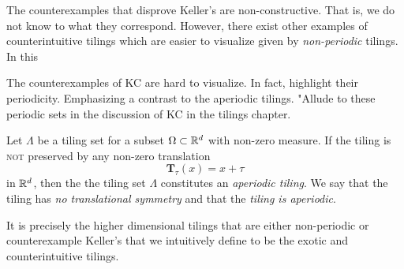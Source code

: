 \documentclass[../thesis.tex]{subfiles}
\begin{document}
The counterexamples that disprove Keller's  are non-constructive. That is, we do not know to what they correspond. However, there exist other examples of counterintuitive tilings which are easier to visualize given by \emph{non-periodic} tilings. In this 

The counterexamples of KC are hard to visualize. In fact, highlight their periodicity. Emphasizing a contrast to the aperiodic tilings. "Allude to these periodic sets in the discussion of KC in the tilings chapter. 

\begin{definition}
    Let $\Lambda$ be a tiling set for a subset $\Omega\subset \mathbb{R}^d$ with non-zero measure. If the tiling is \textsc{not} preserved by any non-zero translation 
    \begin{equation*}
        \mathbf{T}_\tau (x) = x+\tau 
    \end{equation*}
    in $\mathbb{R}^d$, then the the tiling set $\Lambda$ constitutes an \emph{aperiodic tiling}. We say that the tiling has \emph{no translational symmetry} and that the \emph{tiling is aperiodic}.
\end{definition}

It is precisely the higher dimensional tilings that are either non-periodic or counterexample Keller's  that we intuitively define to be the exotic and counterintuitive tilings.

\end{document}
